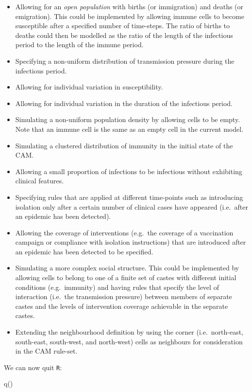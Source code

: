 \documentclass[
  12pt,
  a4paper]{book}
\newenvironment{Shaded}{\begin{snugshade}}{\end{snugshade}}
\newcommand{\FunctionTok}[1]{\textcolor[rgb]{0.00,0.00,0.00}{#1}}
\newcommand{\NormalTok}[1]{#1}
\begin{document}
\begin{itemize}
\item
  Allowing for an \emph{open population} with births (or immigration) and deaths (or emigration). This could be implemented by allowing immune cells to become susceptible after a specified number of time-steps. The ratio of births to deaths could then be modelled as the ratio of the length of the infectious period to the length of the immune period.
\item
  Specifying a non-uniform distribution of transmission pressure during the infectious period.
\item
  Allowing for individual variation in susceptibility.
\item
  Allowing for individual variation in the duration of the infectious period.
\item
  Simulating a non-uniform population density by allowing cells to be empty. Note that an immune cell is the same as an empty cell in the current model.
\item
  Simulating a clustered distribution of immunity in the initial state of the CAM.
\item
  Allowing a small proportion of infections to be infectious without exhibiting clinical features.
\item
  Specifying rules that are applied at different time-points such as introducing isolation only after a certain number of clinical cases have appeared (i.e.~after an epidemic has been detected).
\item
  Allowing the coverage of interventions (e.g.~the coverage of a vaccination campaign or compliance with isolation instructions) that are introduced after an epidemic has been detected to be specified.
\item
  Simulating a more complex social structure. This could be implemented by allowing cells to belong to one of a finite set of castes with different initial conditions (e.g.~immunity) and having rules that specify the level of interaction (i.e.~the transmission pressure) between members of separate castes and the levels of intervention coverage achievable in the separate castes.
\item
  Extending the neighbourhood definition by using the corner (i.e.~north-east, south-east, south-west, and north-west) cells as neighbours for consideration in the CAM rule-set.
\end{itemize}

We can now quit \texttt{R}:

\begin{Shaded}
\begin{Highlighting}[]
\FunctionTok{q}\NormalTok{()}
\end{Highlighting}
\end{Shaded}
\end{document}
